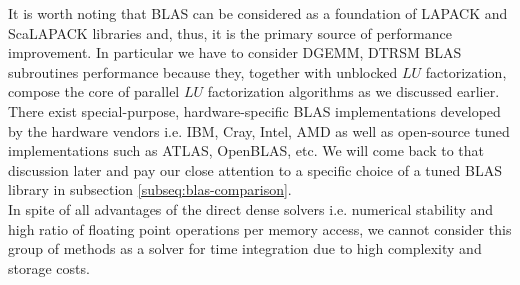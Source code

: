 It is worth noting that BLAS can be considered as a foundation of LAPACK and ScaLAPACK libraries and, thus, it is the primary source of performance improvement. In particular we have to consider DGEMM, DTRSM BLAS subroutines performance because they, together with unblocked $LU$ factorization, compose the core of parallel $LU$ factorization algorithms as we discussed earlier.\\

There exist special-purpose, hardware-specific BLAS implementations developed by the hardware vendors i.e. IBM, Cray, Intel, AMD as well as open-source tuned implementations such as ATLAS, OpenBLAS, etc. We will come back to that discussion later and pay our close attention to a specific choice of a tuned BLAS library in subsection \ref{subseq:blas-comparison}.\\

In spite of all advantages of the direct dense solvers i.e. numerical stability and high ratio of floating point operations per memory access, we cannot consider this group of methods as a solver for time integration due to high complexity and storage costs.
